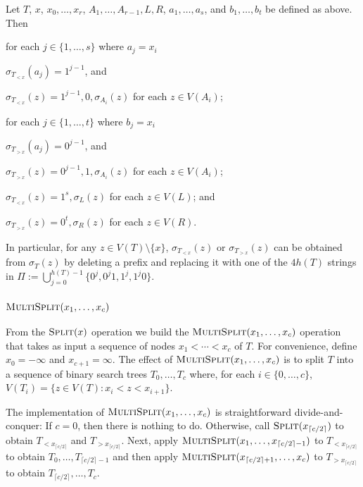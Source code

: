 \documentclass[kpfonts]{patmorin}
\begin{document}
\begin{obs}
  Let $T$, $x$, $x_0,\ldots,x_r$, $A_1,\ldots,A_{r-1},L,R$, $a_1,\ldots,a_s$, and $b_1,\ldots,b_t$ be defined as above. Then
  \begin{compactenum}
    \item for each $j\in\{1,\ldots,s\}$ where $a_j=x_i$
    \begin{compactenum}
      \item $\sigma_{T_{<x}}(a_j)=1^{j-1}$, and 
      \item $\sigma_{T_{<x}}(z) = 1^{j-1},0,\sigma_{A_i}(z)$ for each $z\in V(A_i)$;
    \end{compactenum}
    \item for each $j\in\{1,\ldots,t\}$ where $b_j=x_i$
    \begin{compactenum}
      \item $\sigma_{T_{>x}}(a_j)=0^{j-1}$, and 
      \item $\sigma_{T_{>x}}(z) = 0^{j-1},1,\sigma_{A_i}(z)$ for each $z\in V(A_i)$;
    \end{compactenum}
    \item $\sigma_{T_{<x}}(z)=1^s,\sigma_L(z)$ for each $z\in V(L)$; and
    \item $\sigma_{T_{>x}}(z)=0^t,\sigma_R(z)$ for each $z\in V(R)$.
  \end{compactenum}
  In particular, for any $z\in V(T)\setminus\{x\}$, $\sigma_{T_{<x}}(z)$ or $\sigma_{T_{>x}}(z)$ can be obtained from $\sigma_T(z)$ by deleting a prefix and replacing it with one of the $4h(T)$ strings in $\Pi:=\bigcup_{j=0}^{h(T)-1}\{0^j,0^j1,1^j,1^j0\}$.
\end{obs}

\subsubsection{$\textsc{MultiSplit}(x_1,\ldots,x_c)$}

From the $\textsc{Split}(x)$ operation we build the $\textsc{MultiSplit}(x_1,\ldots,x_c)$ operation that takes as input a sequence of nodes $x_1<\cdots<x_c$ of $T$.  For convenience, define $x_0=-\infty$ and $x_{c+1}=\infty$.  The effect of $\textsc{MultiSplit}(x_1,\ldots,x_c)$ is to split $T$ into a sequence of binary search trees $T_0,\ldots,T_{c}$ where, for each $i\in\{0,\ldots,c\}$, $V(T_i)=\{z\in V(T): x_i< z<x_{i+1}\}$.

The implementation of $\textsc{MultiSplit}(x_1,\ldots,x_c)$ is straightforward divide-and-conquer:  If $c=0$, then there is nothing to do.  Otherwise, call $\textsc{Split}(x_{\lceil c/2\rceil})$ to obtain $T_{<x_{\lceil c/2\rceil}}$ and $T_{>x_{\lceil c/2\rceil}}$.  Next, apply $\textsc{MultiSplit}(x_1,\ldots,x_{\lceil c/2\rceil-1})$ to $T_{<x_{\lceil c/2\rceil}}$ to obtain $T_0,\ldots,T_{\lceil c/2\rceil-1}$ and then apply $\textsc{MultiSplit}(x_{\lceil c/2\rceil+1},\ldots,x_c)$ to $T_{>x_{\lceil c/2\rceil}}$ to obtain $T_{\lceil c/2\rceil},\ldots,T_c$.
\end{document}
